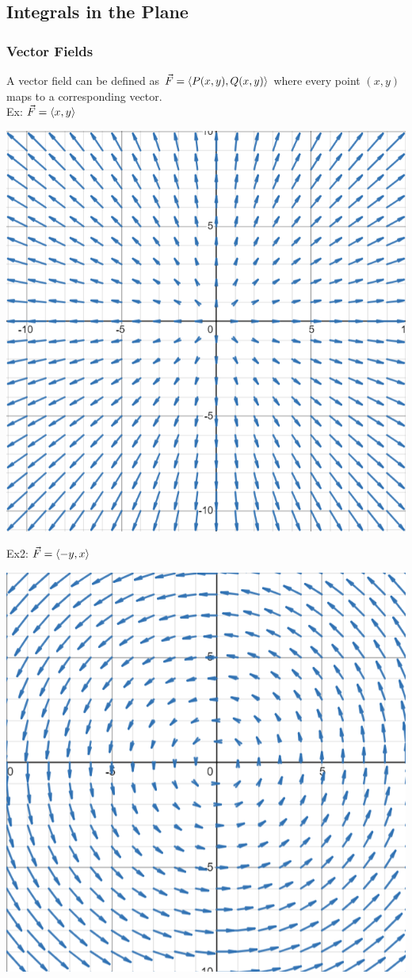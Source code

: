 \documentclass[11pt, fleqn]{article}
\begin{document}
\subsection{Integrals in the Plane}
\subsubsection{Vector Fields}
A vector field can be defined as $\vec{F}=\left\langle P(x,y),Q(x,y) \right\rangle$ where every point $(x,y)$ maps to a corresponding vector.\\
Ex: $\vec{F}=\left\langle x,y \right\rangle$\\
\centerline{\includegraphics[scale=0.6]{Math217Pictures/vectorFieldEx1.png}}
Ex2: $\vec{F}=\left\langle -y,x \right\rangle$\\
\centerline{\includegraphics[scale=0.6]{Math217Pictures/vectorFieldEx2.png}}
\end{document}
